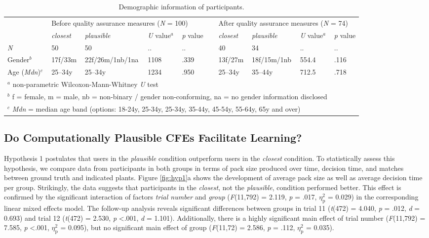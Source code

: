 \begin{table}
  \caption{Demographic information of participants.}
  \label{tab:participants}
\begin{tabular}{llllllllll} 
\toprule
    & \multicolumn{4}{l}{Before quality assurance measures (\textit{N} = 100)} && \multicolumn{4}{l}{After quality assurance measures (\textit{N} = 74)} \\
\cline{2-5}\cline{7-10}
    & \textit{closest} & \textit{plausible} & \textit{U} value$^a$ & \textit{p} value && \textit{closest} & \textit{plausible} & \textit{U} value$^a$ & \textit{p} value\\ 
\hline
\textit{N}   &  50 & 50 & .. & .. && 40 & 34 & .. & .. \\
Gender$^b$ & 17f/33m & 22f/26m/1nb/1na & 1108 & .339 && 13f/27m & 18f/15m/1nb & 554.4 & .116 \\
Age (\textit{Mdn})$^c$ & 25--34y & 25--34y & 1234 & .950 && 25--34y & 35--44y & 712.5 & .718 \\
\bottomrule
\multicolumn{9}{l}{$^a$ non-parametric Wilcoxon-Mann-Whitney \textit{U} test}\\
\multicolumn{9}{l}{$^b$ f = female, m = male, nb = non-binary / gender non-conforming, na = no gender information disclosed}\\
\multicolumn{9}{l}{$^c$ \textit{Mdn} = median age band (options: 18-24y, 25-34y, 25-34y, 35-44y, 45-54y, 55-64y, 65y and over)}
\end{tabular}
\end{table}

\subsection{Do Computationally Plausible CFEs Facilitate Learning?}

Hypothesis 1 postulates that users in the \textit{plausible} condition outperform users in the \textit{closest} condition.
To statistically assess this hypothesis, we compare data from participants in both groups in terms of pack size produced over time, decision time, and matches between ground truth and indicated plants.
Figure \ref{fig:hyp1}a shows the development of average pack size as well as average decision time per group. 
Strikingly, the data suggests that participants in the \textit{closest}, not the \textit{plausible}, condition performed better. 
This effect is confirmed by the significant interaction of factors \textit{trial number} and \textit{group} (\textit{F}(11,792) = 2.119, \textit{p} = .017, $\eta_{\text{p}}^{2}$ = 0.029) in the corresponding linear mixed effects model. The follow-up analysis reveals significant differences between groups in trial 11 (\textit{t}(472) = 4.040, \textit{p} = .012, \textit{d} = 0.693) and trial 12 (\textit{t}(472) = 2.530, \textit{p} \textless .001, \textit{d} = 1.101).
Additionally, there is a highly significant main effect of trial number (\textit{F}(11,792) = 7.585, \textit{p} \textless .001, $\eta_{\text{p}}^{2}$ = 0.095), but no significant main effect of group (\textit{F}(11,72) = 2.586, \textit{p} = .112, $\eta_{\text{p}}^{2}$ = 0.035).

